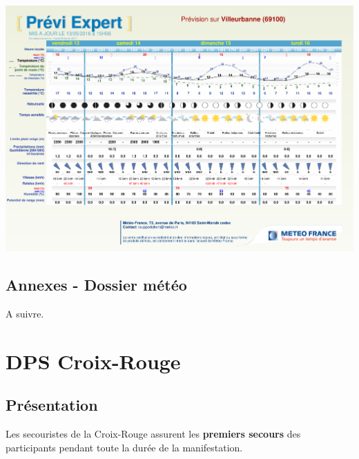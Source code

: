 \documentclass[hidelinks, paper=a4, fontsize=13pt]{report}
\begin{document}
\begin{center}
	\includegraphics[scale=0.45, angle=90]{Annexes/Documents/BulletinMeteo}
	\label{refMeteo}
\end{center}

\subsection{Annexes - Dossier météo}
A suivre.

\section{DPS Croix-Rouge}
\label{refDPSCroixRouge}

\subsection{Présentation}
Les secouristes de la Croix-Rouge assurent les \textbf{premiers secours} des participants pendant toute la durée de la manifestation.\\
\end{document}
